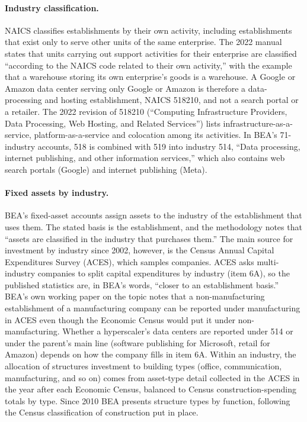 \documentclass[11pt]{article}
\begin{document}
\paragraph{Industry classification.} NAICS classifies establishments by their own activity, including establishments that exist only to serve other units of the same enterprise. The 2022 manual states that units carrying out support activities for their enterprise are classified ``according to the NAICS code related to their own activity,'' with the example that a warehouse storing its own enterprise's goods is a warehouse. A Google or Amazon data center serving only Google or Amazon is therefore a data-processing and hosting establishment, NAICS 518210, and not a search portal or a retailer. The 2022 revision of 518210 (``Computing Infrastructure Providers, Data Processing, Web Hosting, and Related Services'') lists infrastructure-as-a-service, platform-as-a-service and colocation among its activities. In BEA's 71-industry accounts, 518 is combined with 519 into industry 514, ``Data processing, internet publishing, and other information services,'' which also contains web search portals (Google) and internet publishing (Meta).

\paragraph{Fixed assets by industry.} BEA's fixed-asset accounts assign assets to the industry of the establishment that uses them. The stated basis is the establishment, and the methodology notes that ``assets are classified in the industry that purchases them.'' The main source for investment by industry since 2002, however, is the Census Annual Capital Expenditures Survey (ACES), which samples companies. ACES asks multi-industry companies to split capital expenditures by industry (item 6A), so the published statistics are, in BEA's words, ``closer to an establishment basis.'' BEA's own working paper on the topic notes that a non-manufacturing establishment of a manufacturing company can be reported under manufacturing in ACES even though the Economic Census would put it under non-manufacturing. Whether a hyperscaler's data centers are reported under 514 or under the parent's main line (software publishing for Microsoft, retail for Amazon) depends on how the company fills in item 6A. Within an industry, the allocation of structures investment to building types (office, communication, manufacturing, and so on) comes from asset-type detail collected in the ACES in the year after each Economic Census, balanced to Census construction-spending totals by type. Since 2010 BEA presents structure types by function, following the Census classification of construction put in place.
\end{document}
